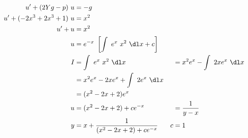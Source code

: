 \begin{enumerate}
\begin{enumerate}
                    \begin{align}
                        u' + (2Yg - p)\ u              & = -g                                                                                              \\
                        u' + (-2x^{3} + 2x^{3} + 1)\ u & = x^{2}                                                                                           \\
                        u' + u                         & = x^{2}                                                                                           \\
                        u                              & = e^{-x}\ \left[ \int\ e^{x}\ x^{2}\ \dl x + c \right]                                            \\
                        I                              & = \int\ e^{x}\ x^{2}\ \dl x                            &   & = x^{2}e^{x} - \int\ 2x e^{x}\ \dl x \\
                                                       & = x^{2}e^{x} - 2xe^{x} + \int\ 2e^{x}\ \dl x                                                      \\
                                                       & = (x^{2} - 2x + 2)e^{x}                                                                           \\
                        u                              & = (x^{2} - 2x + 2) + ce^{-x}                           &   & = \frac{1}{y - x}                    \\
                        y                              & = x + \frac{1}{(x^{2} - 2x + 2) + ce^{-x}}             & c & = 1
                    \end{align}



\end{enumerate}
\end{enumerate}
